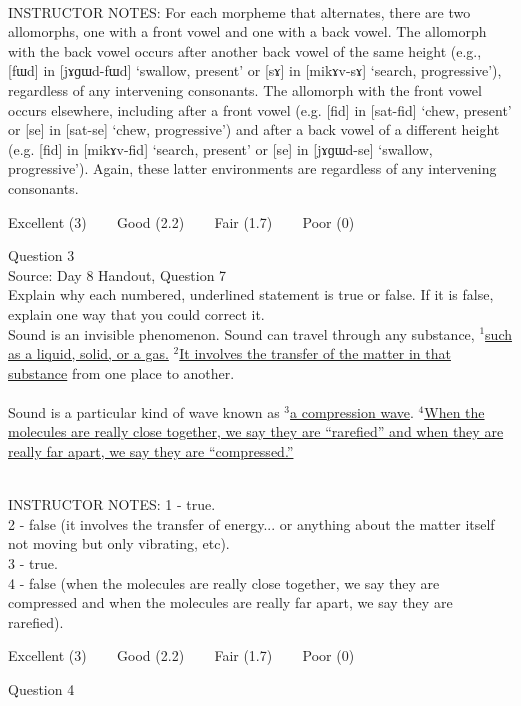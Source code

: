 \documentclass[12pt]{article}
\begin{document}
~\\
INSTRUCTOR NOTES: For each morpheme that alternates, there are two allomorphs, one with a front vowel and one with a back vowel. The allomorph with the back vowel occurs after another back vowel of the same height (e.g., [fɯd] in [jɤɡɯd-fɯd] ‘swallow, present’ or [sɤ] in [mikɤv-sɤ] ‘search, progressive’), regardless of any intervening consonants. The allomorph with the front vowel occurs elsewhere, including after a front vowel (e.g. [fid] in [sat-fid] ‘chew, present’ or [se] in [sat-se] ‘chew, progressive’) and after a back vowel of a different height (e.g. [fid] in [mikɤv-fid] ‘search, present’ or [se] in [jɤɡɯd-se] ‘swallow, progressive’). Again, these latter environments are regardless of any intervening consonants.


\vfill
Excellent (3) ~~~ Good (2.2) ~~~ Fair (1.7) ~~~ Poor (0)
\newpage

{\large Question 3}\\

Source: Day 8 Handout, Question 7\\

Explain why each numbered, underlined statement is true or false. If it is false, explain one way that you could correct it.\\

Sound is an invisible phenomenon. Sound can travel through any substance, $^1$\ul{such as a liquid, solid, or a gas.} $^2$\ul{It involves the transfer of the matter in that substance} from one place to another.\\\\Sound is a particular kind of wave known as $^3$\ul{a compression wave}. $^4$\ul{When the molecules are really close together, we say they are ``rarefied'' and when they are really far apart, we say they are ``compressed.''}


~\\
INSTRUCTOR NOTES: 1 - true.\\2 - false (it involves the transfer of energy... or anything about the matter itself not moving but only vibrating, etc). \\3 - true.\\4 - false (when the molecules are really close together, we say they are compressed and when the molecules are really far apart, we say they are rarefied).


\vfill
Excellent (3) ~~~ Good (2.2) ~~~ Fair (1.7) ~~~ Poor (0)
\newpage

{\large Question 4}\\
\end{document}
